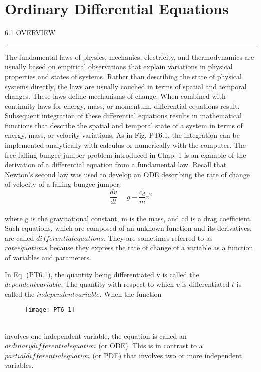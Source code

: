 \documentclass[../main.tex]{subfiles}
\begin{document}
\part{Ordinary Differential
Equations}







\Large{6.1 \; OVERVIEW}\\
\hrule
\vspace{0,5 cm}
The fundamental laws of physics, mechanics, electricity, and thermodynamics are usually
based on empirical observations that explain variations in physical properties and states of
systems. Rather than describing the state of physical systems directly, the laws are usually
couched in terms of spatial and temporal changes. These laws define mechanisms of
change. When combined with continuity laws for energy, mass, or momentum, differential
equations result. Subsequent integration of these differential equations results in mathematical functions that describe the spatial and temporal state of a system in terms of energy,
mass, or velocity variations. As in Fig. PT6.1, the integration can be implemented analytically with calculus or numerically with the computer. The free-falling bungee jumper problem introduced in Chap. 1 is an example of the derivation of a differential equation from a fundamental law. Recall that Newton's second law
was used to develop an ODE describing
the rate of change of velocity of a falling
bungee jumper:
\begin{equation}
\tag{PT6.1}
\dfrac{dv}{dt} = g - \dfrac{c_{d}}{m} v^{2}
\end{equation}\\
where g is the gravitational constant, m is
the mass, and cd is a drag coefficient.
Such equations, which are composed of
an unknown function and its derivatives,
are called $differential equations$. They
are sometimes referred to as $rate equations$ because they express the rate of
change of a variable as a function of variables and parameters.

In Eq. (PT6.1), the quantity being
differentiated v is called the $dependent
variable$. The quantity with respect to
which $v$ is differentiated $t$ is called the
$independent variable$. When the function
\pagebreak
\begin{figure}[hbt!]
	\texttt{[image: PT6\_1]}
	\label{PT6.1}
\end{figure}\\
involves one independent variable, the equation is called an $ordinary differential equation$ (or ODE). This is in contrast to a $partial differential equation$ (or PDE) that involves two
or more independent variables.
\end{document}
